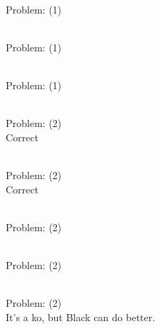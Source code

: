 \documentclass[11pt]{article}
\begin{document}
\begin{minipage}[t]{0.5\textwidth}
  {\centering
  
\\
Problem: (1)\\
  }
\end{minipage}
\begin{minipage}[t]{0.5\textwidth}
  {\centering
  
\\
Problem: (1)\\
  }
\end{minipage}
\begin{minipage}[t]{0.5\textwidth}
  {\centering
  
\\
Problem: (1)\\
  }
\end{minipage}
\begin{minipage}[t]{0.5\textwidth}
  {\centering
  
\\
Problem: (2)\\
Correct\\
  }
\end{minipage}
\begin{minipage}[t]{0.5\textwidth}
  {\centering
  
\\
Problem: (2)\\
Correct\\
  }
\end{minipage}
\begin{minipage}[t]{0.5\textwidth}
  {\centering
  
\\
Problem: (2)\\
  }
\end{minipage}
\begin{minipage}[t]{0.5\textwidth}
  {\centering
  
\\
Problem: (2)\\
  }
\end{minipage}
\begin{minipage}[t]{0.5\textwidth}
  {\centering
  
\\
Problem: (2)\\
It's a ko, but Black can do better.\\
  }
\end{minipage}
\end{document}
